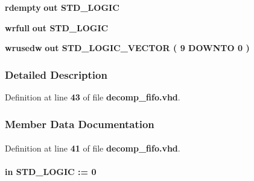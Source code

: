 \begin{DoxyCompactItemize}
\item 
{\bf rdempty}  {\bfseries {\bfseries \textcolor{keywordflow}{out}\textcolor{vhdlchar}{ }}} {\bfseries \textcolor{comment}{S\+T\+D\+\_\+\+L\+O\+G\+IC}\textcolor{vhdlchar}{ }} 
\item 
{\bf wrfull}  {\bfseries {\bfseries \textcolor{keywordflow}{out}\textcolor{vhdlchar}{ }}} {\bfseries \textcolor{comment}{S\+T\+D\+\_\+\+L\+O\+G\+IC}\textcolor{vhdlchar}{ }} 
\item 
{\bf wrusedw}  {\bfseries {\bfseries \textcolor{keywordflow}{out}\textcolor{vhdlchar}{ }}} {\bfseries \textcolor{comment}{S\+T\+D\+\_\+\+L\+O\+G\+I\+C\+\_\+\+V\+E\+C\+T\+OR}\textcolor{vhdlchar}{ }\textcolor{vhdlchar}{(}\textcolor{vhdlchar}{ }\textcolor{vhdlchar}{ } \textcolor{vhdldigit}{9} \textcolor{vhdlchar}{ }\textcolor{keywordflow}{D\+O\+W\+N\+TO}\textcolor{vhdlchar}{ }\textcolor{vhdlchar}{ } \textcolor{vhdldigit}{0} \textcolor{vhdlchar}{ }\textcolor{vhdlchar}{)}\textcolor{vhdlchar}{ }} 
\end{DoxyCompactItemize}


\subsubsection{Detailed Description}


Definition at line {\bf 43} of file {\bf decomp\+\_\+fifo.\+vhd}.



\subsubsection{Member Data Documentation}
\paragraph[{ all }]{\hspace{0.3cm}{\ttfamily [Package]}}\label{classdecomp__fifo_a470a86ce8776f637b0483eabf2d92ad2}


Definition at line {\bf 41} of file {\bf decomp\+\_\+fifo.\+vhd}.

\paragraph[{aclr}]{ {\bfseries \textcolor{keywordflow}{in}\textcolor{vhdlchar}{ }} {\bfseries \textcolor{comment}{S\+T\+D\+\_\+\+L\+O\+G\+IC}\textcolor{vhdlchar}{ }\textcolor{vhdlchar}{ }\textcolor{vhdlchar}{\+:}\textcolor{vhdlchar}{=}\textcolor{vhdlchar}{ }\textcolor{vhdlchar}{ }\textcolor{vhdlchar}{\textquotesingle{}}\textcolor{vhdlchar}{ } \textcolor{vhdldigit}{0} \textcolor{vhdlchar}{ }\textcolor{vhdlchar}{\textquotesingle{}}\textcolor{vhdlchar}{ }} \hspace{0.3cm}{\ttfamily [Port]}}\label{classdecomp__fifo_aa084ae8bf21cb070557c5dda71b8502c}


